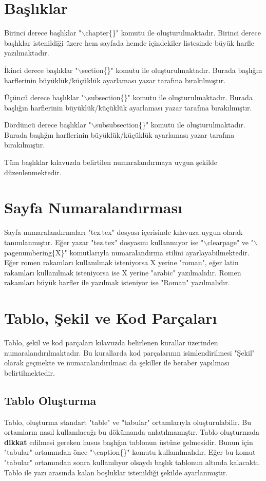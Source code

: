 \chapter{Başlıklar}
Birinci derece başlıklar "$\backslash$chapter\{\}" komutu ile oluşturulmaktadır. Birinci derece başlıklar istenildiği üzere hem sayfada hemde içindekiler listesinde büyük harfle yazılmaktadır. 

İkinci derece başlıklar "$\backslash$section\{\}" komutu ile oluşturulmaktadır. Burada başlığın harflerinin büyüklük/küçüklük ayarlaması yazar tarafına bırakılmıştır.

Üçüncü derece başlıklar "$\backslash$subsection\{\}" komutu ile oluşturulmaktadır. Burada başlığın harflerinin büyüklük/küçüklük ayarlaması yazar tarafına bırakılmıştır.

Dördüncü derece başlıklar "$\backslash$subsubsection\{\}" komutu ile oluşturulmaktadır. Burada başlığın harflerinin büyüklük/küçüklük ayarlaması yazar tarafına bırakılmıştır.

Tüm başlıklar kılavuzda belirtilen numaralandırmaya uygun şekilde düzenlenmektedir. 

\chapter{Sayfa Numaralandırması}
Sayfa numaralandırmaları "tez.tex" dosyası içerisinde kılavuza uygun olarak tanımlanmıştır. Eğer yazar "tez.tex" dosyasını kullanmıyor ise "$\backslash$clearpage" ve "$\backslash$pagenumbering\{X\}" komutlarıyla numaralandırma stilini ayarlayabilmektedir. Eğer romen rakamları kullanılmak isteniyorsa X yerine "roman", eğer latin rakamları kullanılmak isteniyorsa ise X yerine "arabic" yazılmalıdır. Romen rakamları büyük harfler ile yazılmak isteniyor ise "Roman" yazılmalıdır.  

\chapter{Tablo, Şekil ve Kod Parçaları}
Tablo, şekil ve kod parçaları kılavuzda belirlenen kurallar üzerinden numaralandırılmaktadır. Bu kurallarda kod parçalarının isimlendirilmesi "Şekil" olarak geçmekte ve numaralandırılması da şekiller ile beraber yapılması belirtilmektedir. 


\section{Tablo Oluşturma}
Tablo, oluşturma standart "table" ve "tabular" ortamlarıyla oluşturulabilir. Bu ortamların nasıl kullanılacağı bu dökümanda anlatılmamıştır. Tablo oluşturmada \textbf{dikkat} edilmesi gereken husus başlığın tablonun üstüne gelmesidir. Bunun için "tabular" ortamından önce "$\backslash$caption\{\}" komutu kullanılmalıdır. Eğer bu komut "tabular" ortamından sonra kullanılıyor olsaydı başlık tablonun altında kalacaktı. Tablo ile yazı arasında kalan boşluklar istenildiği şekilde ayarlanmıştır. 

